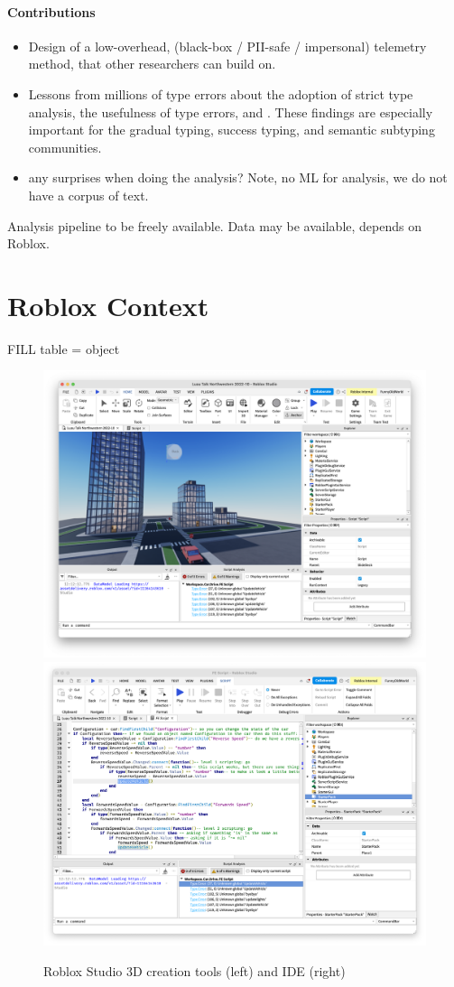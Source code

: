 \documentclass[english,submission,cleveref]{programming}
\begin{document}
\paragraph{Contributions}
\begin{itemize}
  \item
    Design of a low-overhead, (black-box / PII-safe / impersonal)
    telemetry method, that other
    researchers can build on.

  \item
    Lessons from millions of type errors about
    the adoption of strict type analysis,
    the usefulness of type errors,
    and \FILL{}.
    These findings are especially important for the
    gradual typing, success typing, and semantic subtyping communities.

  \item
    \FILL{} any surprises when doing the analysis?
    Note, no ML for analysis, we do not have a corpus of text.

\end{itemize}

Analysis pipeline to be freely available.
Data may be available, depends on Roblox.


\section{{Roblox} Context}

FILL table = object

\begin{figure}

  \includegraphics[width=.45\textwidth]{img/roblox-studio.png}
  \includegraphics[width=.45\textwidth]{img/roblox-studio-ide.png}

  \caption{{Roblox Studio 3D creation} tools (left) and IDE (right)}
  \label{fig:roblox-studio}
\end{figure}
\end{document}
